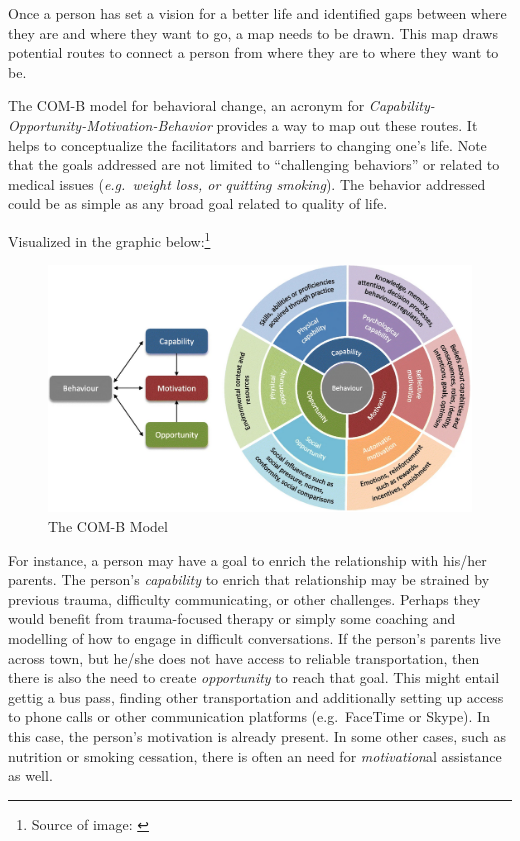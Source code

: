 \documentclass[
]{book}
\begin{document}
Once a person has set a vision for a better life and identified gaps between where they are and where they want to go, a map needs to be drawn. This map draws potential routes to connect a person from where they are to where they want to be.

The COM-B model for behavioral change, an acronym for \emph{Capability-Opportunity-Motivation-Behavior} provides a way to map out these routes. It helps to conceptualize the facilitators and barriers to changing one's life. Note that the goals addressed are not limited to ``challenging behaviors'' or related to medical issues (\emph{e.g.~weight loss, or quitting smoking}). The behavior addressed could be as simple as any broad goal related to quality of life.

Visualized in the graphic below:\footnote{Source of image: \citet{comb-pic}}

\begin{figure}
\includegraphics[width=31.3in]{_bookdown_files/img/com-b} \caption{The COM-B Model}\label{fig:unnamed-chunk-4}
\end{figure}

For instance, a person may have a goal to enrich the relationship with his/her parents. The person's \emph{capability} to enrich that relationship may be strained by previous trauma, difficulty communicating, or other challenges. Perhaps they would benefit from trauma-focused therapy or simply some coaching and modelling of how to engage in difficult conversations. If the person's parents live across town, but he/she does not have access to reliable transportation, then there is also the need to create \emph{opportunity} to reach that goal. This might entail gettig a bus pass, finding other transportation and additionally setting up access to phone calls or other communication platforms (e.g.~FaceTime or Skype). In this case, the person's motivation is already present. In some other cases, such as nutrition or smoking cessation, there is often an need for \emph{motivation}al assistance as well.
\end{document}
